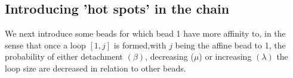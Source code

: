 \documentclass[12pt]{article}
\begin{document}
\subsection{Introducing 'hot spots' in the chain} 
We next introduce some beads for which bead 1 have more affinity to, in the sense that once a loop $[1,j]$ is formed,with $j$ being the affine bead to 1, the probability of either detachment $(\beta)$, decreasing ($\mu$) or increasing $(\lambda)$ the loop size are decreased in relation to other beads.
\end{document}
